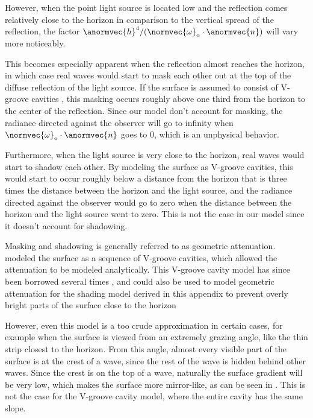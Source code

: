 However, when the point light source is located low and the reflection comes relatively close to the horizon in comparison to the vertical spread of the reflection, the factor $\anormvec{h}^4/(\normvec{\omega}_{\text{o}}\cdot\anormvec{n})$ will vary more noticeably.

This becomes especially apparent when the reflection almost reaches the horizon, in which case real waves would start to mask each other out at the top of the diffuse reflection of the light source. If the surface is assumed to consist of V-groove cavities \citep{Torrance1967}, this masking occurs roughly above one third from the horizon to the center of the reflection. Since our model don't account for masking, the radiance directed against the observer will go to infinity when $\normvec{\omega}_{\text{o}}\cdot\anormvec{n}$ goes to 0, which is an unphysical behavior.

Furthermore, when the light source is very close to the horizon, real waves would start to shadow each other. By modeling the surface as V-groove cavities, this would start to occur roughly below a distance from the horizon that is three times the distance between the horizon and the light source, and the radiance directed against the observer would go to zero when the distance between the horizon and the light source went to zero. This is not the case in our model since it doesn't account for shadowing.

Masking and shadowing is generally referred to as geometric attenuation. \citet{Torrance1967} modeled the surface as a sequence of V-groove cavities, which allowed the attenuation to be modeled analytically. This V-groove cavity model has since been borrowed several times \citep{Blinn1977,Oren1994}, and could also be used to model geometric attenuation for the shading model derived in this appendix to prevent overly bright parts of the surface close to the horizon

However, even this model is a too crude approximation in certain cases, for example when the surface is viewed from an extremely grazing angle, like the thin strip closest to the horizon. From this angle, almost every visible part of the surface is at the crest of a wave, since the rest of the wave is hidden behind other waves. Since the crest is on the top of a wave, naturally the surface gradient will be very low, which makes the surface more mirror-like, as can be seen in . This is not the case for the V-groove cavity model, where the entire cavity has the same slope.